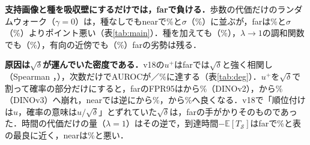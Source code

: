 \documentclass[a4paper,10pt,dvipdfmx]{jsarticle}
\theoremstyle{definition}
\newcommand{\cS}{\mathcal{S}}
\newcommand{\E}{\mathbb{E}}
\newcommand{\AUC}{AUROC}
\newcommand{\FPR}{FPR95}
\newcommand{\tabref}[1]{表\ref{#1}}
\begin{document}
\begin{table}[t]
\centering
\caption{dev1での読み出しの比較（[\%]，単体，5通りの抽出の平均）．誤警報率はIDのテスト画像のうち$p\le0.05$となった割合（共形$p$値を返す構成のみ）．太字は列の最良．}
\label{tab:main}
\small
\setlength{\tabcolsep}{4pt}

\end{table}

\textbf{支持画像と種を吸収壁にするだけでは，farで負ける．}歩数の代価だけのランダムウォーク（$\gamma{=}0$）は，種なしでもnearで\NAbsOneNear\%と$\sigma$（\NSigNear\%）に並ぶが，farは\NAbsOneFar\%と$\sigma$（\NSigFar\%）より\NAbsOneGapFar{}ポイント悪い（\tabref{tab:main}）．種を加えても（\NAbsXfitFar\%），$\lambda\to1$の調和関数でも（\NHarmFar\%），有向の近傍でも（\NDirFar\%）farの劣勢は残る．

\begin{table}[t]
\centering
\caption{v18の$u^{+}$の次数成分（dev1，5通りの抽出の平均）．\AUC$(\delta)$，\FPR$(\delta)$は次数$\delta$だけをスコアにした値．}
\label{tab:deg}
\small

\end{table}

\textbf{原因は$\sqrt{\delta}$が運んでいた密度である．}v18の$u^{+}$はfarでは$\sqrt{\delta}$と強く相関し（Spearman \NDegSpFarL{}，\NDegSpFarD），次数だけで\AUC{}が\NDegAucFarL{}／\NDegAucFarD\%に達する（\tabref{tab:deg}）．$u^{+}$を$\sqrt{\delta}$で割って確率の部分だけにすると，farの\FPR{}は\NUFprFarL{}から\NUnFprFarL\%（DINOv2），\NUFprFarD{}から\NUnFprFarD\%（DINOv3）へ崩れ，nearでは逆に\NUFprNearL{}から\NUnFprNearL\%，\NUFprNearD{}から\NUnFprNearD\%へ良くなる．v18で「順位付けは$u$，確率の意味は$u/\sqrt{\delta}$」とずれていた$\sqrt{\delta}$は，farの手がかりそのものであった．時間の代価だけの量（$\lambda{=}1$）はその逆で，到達時間$-\E[T_{\cS}]$はfarで\NCtHitFar\%と表の最良に近く，nearは\NCtHitNear\%と悪い．

\begin{table}[t]
\centering
\caption{$\lambda\times\gamma$の格子（dev1の\FPR{} [\%]，far\,/\,near；和グラフ$W_{\mathrm{L14}}+W_{\mathrm{D3L}}$の上の1本のランダムウォーク）．$\gamma{=}1$は和グラフの次数の中央値（\NMedDegLo--\NMedDegHi）の約1/16．}
\label{tab:grid}
\small

\end{table}
\end{document}
